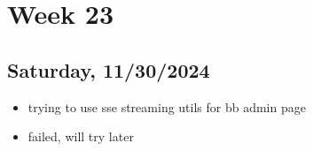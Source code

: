 \newpage
\section{Week 23}

\subsection{Saturday, 11/30/2024}
\begin{itemize}
    \item trying to use sse streaming utils for bb admin page
    \item failed, will try later
\end{itemize}
